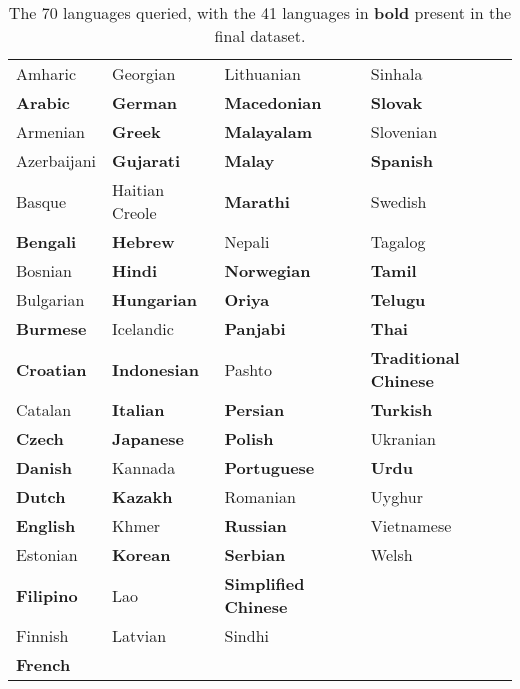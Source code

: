 \documentclass[sigconf,natbib=true,anonymous=false,nonacm]{acmart}
\begin{document}
\setlength{\tabcolsep}{1pt}

\begin{table}[H]
    \caption{The 70 languages queried, with the 41 languages in \textbf{bold}
    present in the final dataset.}
    \begin{center}
        \begin{tabular}{llll}
            Amharic & Georgian & Lithuanian & Sinhala \\
            \textbf{Arabic} & \textbf{German} & \textbf{Macedonian} &
                \textbf{Slovak} \\
            Armenian & \textbf{Greek} & \textbf{Malayalam} & Slovenian \\
            Azerbaijani & \textbf{Gujarati} & \textbf{Malay} &
                \textbf{Spanish} \\
            Basque & Haitian Creole & \textbf{Marathi} & Swedish \\
            \textbf{Bengali} & \textbf{Hebrew} & Nepali & Tagalog \\
            Bosnian & \textbf{Hindi} & \textbf{Norwegian} & \textbf{Tamil} \\
            Bulgarian & \textbf{Hungarian} & \textbf{Oriya} & \textbf{Telugu} \\
            \textbf{Burmese} & Icelandic & \textbf{Panjabi} & \textbf{Thai} \\
            \textbf{Croatian} & \textbf{Indonesian} & Pashto &
                \textbf{Traditional Chinese} \\
            Catalan & \textbf{Italian} & \textbf{Persian} & \textbf{Turkish} \\
            \textbf{Czech} & \textbf{Japanese} & \textbf{Polish} & Ukranian \\
            \textbf{Danish} & Kannada & \textbf{Portuguese} & \textbf{Urdu} \\
            \textbf{Dutch} & \textbf{Kazakh} & Romanian & Uyghur \\
            \textbf{English} & Khmer & \textbf{Russian} & Vietnamese \\
            Estonian & \textbf{Korean} & \textbf{Serbian} & Welsh \\
            \textbf{Filipino} & Lao & \textbf{Simplified Chinese} \\
            Finnish & Latvian & Sindhi \\
            \textbf{French}
        \end{tabular}
        \label{tab:bcp47}
    \end{center}
\end{table}
\end{document}
